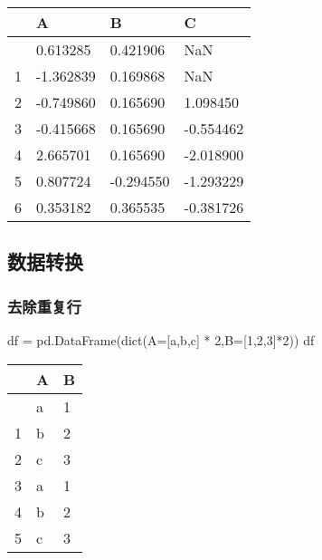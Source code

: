 \documentclass[
  letterpaper,
  DIV=11,
  numbers=noendperiod]{scrreprt}
\newenvironment{Shaded}{\begin{snugshade}}{\end{snugshade}}
\newcommand{\BuiltInTok}[1]{\textcolor[rgb]{0.00,0.23,0.31}{#1}}
\newcommand{\DecValTok}[1]{\textcolor[rgb]{0.68,0.00,0.00}{#1}}
\newcommand{\NormalTok}[1]{\textcolor[rgb]{0.00,0.23,0.31}{#1}}
\newcommand{\OperatorTok}[1]{\textcolor[rgb]{0.37,0.37,0.37}{#1}}
\newcommand{\StringTok}[1]{\textcolor[rgb]{0.13,0.47,0.30}{#1}}
\begin{document}
\begin{longtable}[]{@{}llll@{}}
\toprule\noalign{}
& A & B & C \\
\midrule\noalign{}
\endhead
\bottomrule\noalign{}
\endlastfoot
0 & 0.613285 & 0.421906 & NaN \\
1 & -1.362839 & 0.169868 & NaN \\
2 & -0.749860 & 0.165690 & 1.098450 \\
3 & -0.415668 & 0.165690 & -0.554462 \\
4 & 2.665701 & 0.165690 & -2.018900 \\
5 & 0.807724 & -0.294550 & -1.293229 \\
6 & 0.353182 & 0.365535 & -0.381726 \\
\end{longtable}

\hypertarget{ux6570ux636eux8f6cux6362}{%
\subsection{数据转换}\label{ux6570ux636eux8f6cux6362}}

\hypertarget{ux53bbux9664ux91cdux590dux884c}{%
\subsubsection{去除重复行}\label{ux53bbux9664ux91cdux590dux884c}}

\begin{Shaded}
\begin{Highlighting}[]
\NormalTok{df }\OperatorTok{=}\NormalTok{ pd.DataFrame(}\BuiltInTok{dict}\NormalTok{(A}\OperatorTok{=}\NormalTok{[}\StringTok{\textquotesingle{}a\textquotesingle{}}\NormalTok{,}\StringTok{\textquotesingle{}b\textquotesingle{}}\NormalTok{,}\StringTok{\textquotesingle{}c\textquotesingle{}}\NormalTok{] }\OperatorTok{*} \DecValTok{2}\NormalTok{,B}\OperatorTok{=}\NormalTok{[}\DecValTok{1}\NormalTok{,}\DecValTok{2}\NormalTok{,}\DecValTok{3}\NormalTok{]}\OperatorTok{*}\DecValTok{2}\NormalTok{))}
\NormalTok{df}
\end{Highlighting}
\end{Shaded}

\begin{longtable}[]{@{}lll@{}}
\toprule\noalign{}
& A & B \\
\midrule\noalign{}
\endhead
\bottomrule\noalign{}
\endlastfoot
0 & a & 1 \\
1 & b & 2 \\
2 & c & 3 \\
3 & a & 1 \\
4 & b & 2 \\
5 & c & 3 \\
\end{longtable}
\end{document}
